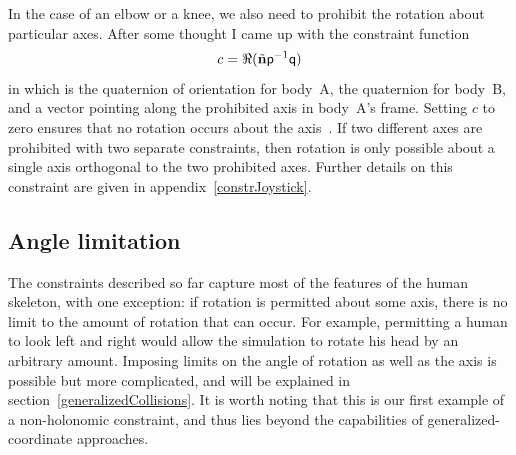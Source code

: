 In the case of an elbow or a knee, we also need to prohibit the rotation about particular axes.
After some thought I came up with the constraint function
\begin{equation}\label{rotationConstraintEqn}
c = \Re(\tilde{\ve{n}}\q{p}^{-1}\q{q})
\end{equation}
in which  is the quaternion of orientation for body~A,  the quaternion for body~B, and
 a vector pointing along the prohibited axis in body~A's frame. Setting $c$ to zero ensures
that no rotation occurs about the axis~. If two different axes are prohibited with two
separate constraints, then rotation is only possible about a single axis orthogonal to the two
prohibited axes. Further details on this constraint are given in appendix~\ref{constrJoystick}.

\subsection{Angle limitation\label{angleLimitation}}

The constraints described so far capture most of the features of the human skeleton, with one
exception: if rotation is permitted about some axis, there is no limit to the amount of rotation
that can occur. For example, permitting a human to look left and right would allow the simulation
to rotate his head by an arbitrary amount. Imposing
limits on the angle of rotation as well as the axis is possible but more complicated, and will
be explained in section~\ref{generalizedCollisions}. It is worth noting that this is our
first example of a non-holonomic constraint, and thus lies beyond the capabilities of
generalized-coordinate approaches.
